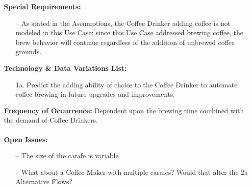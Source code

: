 \documentclass[letterpaper]{article}
\begin{document}
\textbf{Special Requirements:  }
\begin{itemize}
\item [--]As stated in the Assumptions, the Coffee Drinker adding
coffee
is not modeled in this Use Case; since this Use Case addressed brewing
coffee, the brew behavior will continue regardless of the addition of
unbrewed coffee grounds.
\end{itemize}
\textbf{Technology \& Data Variations List: }
\begin{itemize}
\item[1a.] Predict the adding ability of choice to the Coffee Drinker
to automate coffee brewing in future upgrades and improvements.
\end{itemize}
\textbf{Frequency of Occurrence: } Dependent upon the brewing time
combined with the demand of Coffee Drinkers.\\\\
\textbf{Open Issues: }
\begin{itemize}
\item[--]The size of the carafe is variable
\item[--]What about a Coffee Maker with multiple carafes?  Would that
alter the 2a Alternative Flows?
\end{itemize}
\end{document}
